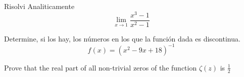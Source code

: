 \documentclass[11pt, a4paper]{exam}
\begin{document}
\begin{questions}
\addpoints
\question[25] Risolvi Analiticamente
	\[
		\lim _{x \to 1} \frac{x^3 - 1}{x^2 - 1}
	\]

\addpoints
\question[25] Determine, si los hay, los n\'umeros en los que la funci\'on dada es discontinua.
	\[
		f(x) = (x^2 - 9x + 18)^{-1}
	\]

%
%
%
%
%

%
%


\bonusquestion[30] Prove that the real part of all non-trivial zeros of the function 
\(\zeta(z)\) is \(\frac{1}{2}\)

\end{questions}

%

%
\end{document}

